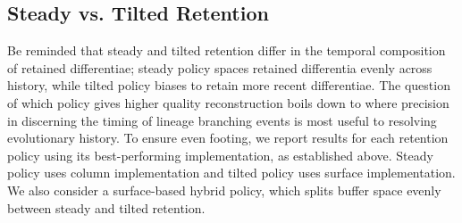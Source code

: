 

\subsection{Steady vs. Tilted Retention} \label{sec:steady-vs-tilted}



Be reminded that steady and tilted retention differ in the temporal composition of retained differentiae;
steady policy spaces retained differentia evenly across history, while tilted policy biases to retain more recent differentiae.
The question of which policy gives higher quality reconstruction boils down to where precision in discerning the timing of lineage branching events is most useful to resolving evolutionary history.
To ensure even footing, we report results for each retention policy using its best-performing implementation, as established above.
Steady policy uses column implementation and tilted policy uses surface implementation.
We also consider a surface-based hybrid policy, which splits buffer space evenly between steady and tilted retention.

